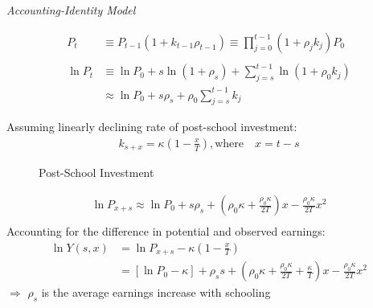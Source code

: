 \begin{frame}\begin{center}
\LARGE\textit{Accounting-Identity Model}
\end{center}\end{frame}

\begin{frame}
\begin{align*}
P_t & \equiv P_{t - 1} (1 + k_{t - 1} \rho_{t - 1}) \equiv \prod^{t - 1}_{j= 0} (1 + \rho_jk_j)P_0 \\
& \\
\ln P_t & \equiv \ln P_0  + s \ln(1 + \rho_s) + \sum^{t -1}_{j=s} \ln(1 + \rho_0 k_j) \\
& \approx  \ln P_0 + s \rho_s + \rho_0 \sum^{t - 1}_{j=s} k_j
\end{align*}
\end{frame}



\begin{frame}
Assuming linearly declining rate of post-school investment:
\begin{align*}
k_{s + x} = \kappa\left( 1 - \frac{x}{T}\right),\text{where} \quad x = t - s
\end{align*}
\end{frame}

\begin{frame}
\begin{figure}[htp]\centering
\caption{Post-School Investment}\label{Post-School Investment}
\end{figure}
\end{frame}

\begin{frame}
 \begin{align*}
 \ln P_{x + s}  \approx \ln P_0 + s\rho_s + \left(\rho_0 \kappa + \frac{\rho_0\kappa}{2T}\right)x - \frac{\rho_0\kappa}{2T} x^2 \\
 \end{align*}
Accounting for the difference in potential and observed earnings:
\begin{align*}
\ln Y(s, x) & = \ln P_{x + s} - \kappa\left(1 - \frac{x}{T}\right) \\
            & = [\ln P_0 - \kappa] + \rho_s s + \left(\rho_0\kappa + \frac{\rho_0\kappa}{2T} + \frac{\kappa}{T}\right) x - \frac{\rho_0\kappa}{2T}x^2
\end{align*}
$\Rightarrow$ $\rho_s$ is the average earnings increase with schooling
\end{frame}

